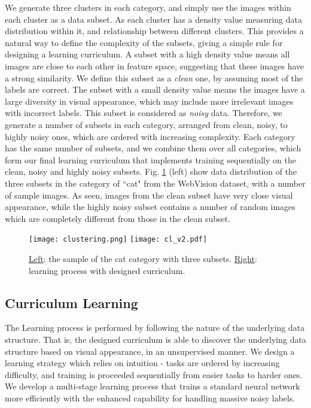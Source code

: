 \documentclass[runningheads]{llncs}
\begin{document}
We generate three clusters in each category, and simply use the images within each cluster as a data subset. As each cluster has a density value measuring data distribution within it, and relationship between different clusters. This provides a natural way to define the complexity of the subsets, giving a simple rule for designing a learning curriculum. A subset with a high density value means all images are close to each other in feature space, suggesting that these images have a strong similarity. We define this subset as a \emph{clean} one, by assuming most of the labels are correct. The subset with a small density value means the images have a large diversity in visual appearance, which may include more irrelevant images with incorrect labels. This subset is considered as \emph{noisy} data. Therefore, we generate a number of subsets in each category, arranged from clean, noisy, to highly noisy ones, which are ordered with increasing complexity. Each category has the same number of  subsets, and we combine them over all categories, which form our final learning curriculum that implements training sequentially on the clean, noisy and highly noisy subsets.  Fig. \ref{fig:curriculum_learning} (left) show data distribution of the three subsets in the category of ``cat" from the WebVision dataset, with a number of sample images. As seen, images from the clean subset have very close visual appearance, while the highly noisy subset contains a number of random images which are completely different from those in the clean subset.

\begin{figure}[tb]
	\begin{center}
		\texttt{[image: clustering.png]}
		\texttt{[image: cl\_v2.pdf]}
	\end{center}
	\caption{\underline{Left}: the sample of the cat category with three subsets. \underline{Right}: learning process with designed curriculum.}
	\label{fig:curriculum_learning}
\end{figure}

\subsection{Curriculum Learning}
The Learning process is performed by following the nature of the underlying data structure. That is, the designed curriculum is able to discover the underlying data structure based on visual appearance, in an unsupervised manner. We design a learning strategy which relies on intuition - tasks are ordered by increasing difficulty, and training is proceeded sequentially from easier tasks to harder ones. We develop a multi-stage learning process that trains a standard neural network more efficiently with the enhanced capability for handling massive noisy labels.
\end{document}
